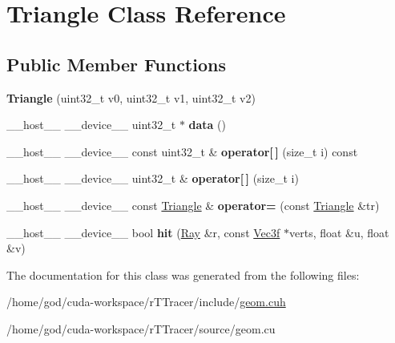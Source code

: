\hypertarget{class_triangle}{}\section{Triangle Class Reference}
\label{class_triangle}
\subsection*{Public Member Functions}
\begin{DoxyCompactItemize}
\item 
{\bfseries Triangle} (uint32\+\_\+t v0, uint32\+\_\+t v1, uint32\+\_\+t v2)\hypertarget{class_triangle_a8532ce36a26abc9ab0064533ee880b67}{}\label{class_triangle_a8532ce36a26abc9ab0064533ee880b67}

\item 
\+\_\+\+\_\+host\+\_\+\+\_\+ \+\_\+\+\_\+device\+\_\+\+\_\+ uint32\+\_\+t $\ast$ {\bfseries data} ()\hypertarget{class_triangle_a100d35fe94ff02922981eabe1730f9f4}{}\label{class_triangle_a100d35fe94ff02922981eabe1730f9f4}

\item 
\+\_\+\+\_\+host\+\_\+\+\_\+ \+\_\+\+\_\+device\+\_\+\+\_\+ const uint32\+\_\+t \& {\bfseries operator\mbox{[}$\,$\mbox{]}} (size\+\_\+t i) const\hypertarget{class_triangle_a9ac6b64d26db74a4227eca4a0b3a437b}{}\label{class_triangle_a9ac6b64d26db74a4227eca4a0b3a437b}

\item 
\+\_\+\+\_\+host\+\_\+\+\_\+ \+\_\+\+\_\+device\+\_\+\+\_\+ uint32\+\_\+t \& {\bfseries operator\mbox{[}$\,$\mbox{]}} (size\+\_\+t i)\hypertarget{class_triangle_a51ae109c4a21132769252965eb4745e8}{}\label{class_triangle_a51ae109c4a21132769252965eb4745e8}

\item 
\+\_\+\+\_\+host\+\_\+\+\_\+ \+\_\+\+\_\+device\+\_\+\+\_\+ const \hyperlink{class_triangle}{Triangle} \& {\bfseries operator=} (const \hyperlink{class_triangle}{Triangle} \&tr)\hypertarget{class_triangle_a957601b66c9bc185e081a9c0b16a11ad}{}\label{class_triangle_a957601b66c9bc185e081a9c0b16a11ad}

\item 
\+\_\+\+\_\+host\+\_\+\+\_\+ \+\_\+\+\_\+device\+\_\+\+\_\+ bool {\bfseries hit} (\hyperlink{class_ray}{Ray} \&r, const \hyperlink{class_vec3}{Vec3f} $\ast$verts, float \&u, float \&v)\hypertarget{class_triangle_a853b6db440f108fe7581e2fc8a90bdc9}{}\label{class_triangle_a853b6db440f108fe7581e2fc8a90bdc9}

\end{DoxyCompactItemize}


The documentation for this class was generated from the following files\+:\begin{DoxyCompactItemize}
\item 
/home/god/cuda-\/workspace/r\+T\+Tracer/include/\hyperlink{geom_8cuh}{geom.\+cuh}\item 
/home/god/cuda-\/workspace/r\+T\+Tracer/source/geom.\+cu\end{DoxyCompactItemize}
